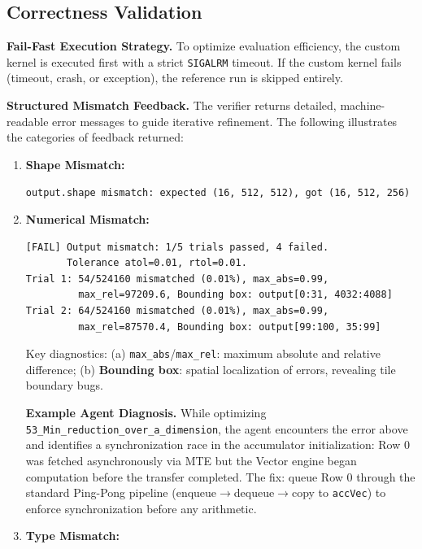 \documentclass{article} %
\theoremstyle{definition}
\theoremstyle{remark}
\begin{document}
  \subsection{Correctness Validation}

  \textbf{Fail-Fast Execution Strategy.}
  To optimize evaluation efficiency, the custom kernel is executed first with a strict \texttt{SIGALRM} timeout. If the custom kernel fails (timeout, crash, or exception), the reference run is skipped entirely.

  \textbf{Structured Mismatch Feedback.}
  The verifier returns detailed, machine-readable error messages to guide iterative refinement. The following illustrates the categories of feedback returned:

  \begin{enumerate}[itemsep=6pt,parsep=0pt,topsep=4pt]
      \item \textbf{Shape Mismatch:}
      \vspace{2pt} 

      \texttt{output.shape mismatch: expected (16, 512, 512), got (16, 512, 256)}

      \item \textbf{Numerical Mismatch:}
      \vspace{2pt} 
      \begin{verbatim}
[FAIL] Output mismatch: 1/5 trials passed, 4 failed.
       Tolerance atol=0.01, rtol=0.01.
Trial 1: 54/524160 mismatched (0.01%), max_abs=0.99,
         max_rel=97209.6, Bounding box: output[0:31, 4032:4088]
Trial 2: 64/524160 mismatched (0.01%), max_abs=0.99,
         max_rel=87570.4, Bounding box: output[99:100, 35:99]
      \end{verbatim}
      \vspace{-5pt} 
      Key diagnostics: (a) \texttt{max\_abs}/\texttt{max\_rel}: maximum absolute and relative difference; (b) \textbf{Bounding box}: spatial localization of errors, revealing tile boundary bugs.

      \textbf{Example Agent Diagnosis.} While optimizing \texttt{53\_Min\_reduction\_over\_a\_dimension}, the agent encounters the error above and identifies a synchronization race in the accumulator initialization: Row 0 was fetched asynchronously via MTE but the Vector engine began computation before the transfer completed. The fix: queue Row 0 through the standard Ping-Pong pipeline (enqueue$\to$dequeue$\to$copy to \texttt{accVec}) to enforce synchronization before any arithmetic.

      \item \textbf{Type Mismatch:}
    \vspace{2pt} 
    

\end{enumerate}
\end{document}
